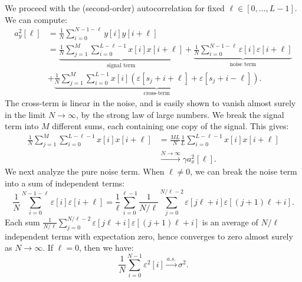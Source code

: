\documentclass[9pt,twocolumn,twoside,lineno]{pnas-new}
\begin{document}
We proceed with the (second-order) autocorrelation for fixed $\ell\in[0,\ldots,L-1]$. We can compute:
%
\begin{align*}
%
a_y^2[\ell] & = \frac{1}{N}\sum_{i=0}^{N-1-\ell}y[i]y[i+\ell]
\nonumber \\
& = \underbrace{\frac{1}{N}\sum_{j=1}^{M}\sum_{i=0}^{L-\ell-1}x[i]x[i+\ell]}_{\text{signal term}} + \underbrace{\frac{1}{N}\sum_{i=0}^{N-1-\ell}\varepsilon[i]\varepsilon[i+\ell]}_{\text{noise term}}
\\ & + \underbrace{\frac{1}{N} \sum_{j=1}^{M} \sum_{i=0}^{L-1} x[i] (\varepsilon[s_j + i + \ell] + \varepsilon[s_j + i - \ell])}_{\text{cross-term}}. 
%
\end{align*}
The cross-term is linear in the noise, and is easily shown to vanish almost surely in the limit $N\to\infty$, by the strong law of large numbers. We break the signal term into $M$ different sums, each containing one copy of the signal. This gives:
%
\begin{align} \label{eq:2nd_moment_signal_term}
%
\frac{1}{N}\sum_{j=1}^{M}\sum_{i=0}^{L-\ell-1}x[i]x[i+\ell] & = \frac{ML}{N}\frac{1}{L}\sum_{i=0}^{L-\ell-1}x[i]x[i+\ell]\nonumber\\&\xrightarrow{N\to\infty}\gamma a_x^2[\ell].
%
\end{align}
%
We next analyze the pure noise term. When $\ell\neq 0$, we can break the noise term into a sum of independent terms:
%
\begin{equation*}
%
\frac{1}{N}\sum_{i=0}^{N-1-\ell} \varepsilon[i]\varepsilon[i+\ell] = \frac{1}{\ell}\sum_{i=0}^{\ell-1}\frac{1}{N/\ell}\sum_{j=0}^{N/\ell -2} \varepsilon[j\ell + i] \varepsilon[(j+1)\ell + i].
%
\end{equation*}
%
Each sum $\frac{1}{N/\ell}\sum_{j=0}^{N/\ell -2} \varepsilon[j\ell + i] \varepsilon[(j+1)\ell + i]$ is an average of $N/\ell$ independent terms with expectation zero, hence converges to zero almost surely as $N\to\infty$. If $\ell=0$, then we have:
%
\begin{equation*}
%
\frac{1}{N}\sum_{i=0}^{N-1} \varepsilon^2[i] \xrightarrow{a.s.} \sigma^2.
%
\end{equation*}
\end{document}
